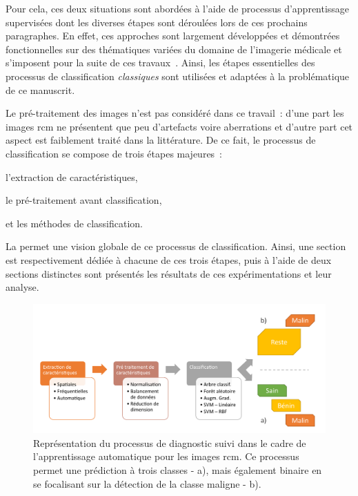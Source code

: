 Pour cela, ces deux situations sont abordées à l'aide de processus d'apprentissage supervisées dont les diverses étapes sont déroulées lors de ces prochains paragraphes. En effet, ces approches sont largement développées et démontrées fonctionnelles sur des thématiques variées du domaine de l'imagerie médicale et s'imposent pour la suite de ces travaux~\cite{Litjens2017,Pathan2018}. Ainsi, les étapes essentielles des processus de classification \textit{classiques} sont utilisées et adaptées à la problématique de ce manuscrit.\par

Le pré-traitement des images n'est pas considéré dans ce travail~: d'une part les images \gls{rcm} ne présentent que peu d'artefacts voire aberrations et d'autre part cet aspect est faiblement traité dans la littérature. De ce fait, le processus de classification se compose de trois étapes majeures~:
\begin{inlinerate}
    \item l'extraction de caractéristiques,
    \item le pré-traitement avant classification,
    \item et les méthodes de classification.
\end{inlinerate} La  permet une vision globale de ce processus de classification. Ainsi, une section est respectivement dédiée à chacune de ces trois étapes, puis à l'aide de deux sections distinctes sont présentés les résultats de ces expérimentations et leur analyse.\par

\begin{figure}[H]
\centering
    \includegraphics[width=\linewidth]{contents/chapter_4/resources/scheme_macro_image_classification.pdf}
    \caption{Représentation du processus de diagnostic suivi dans le cadre de l'apprentissage automatique pour les images \gls{rcm}. Ce processus permet une prédiction à trois classes - a), mais également binaire en se focalisant sur la détection de la classe maligne - b).}
    \label{fig:scheme_macro_image_classification}
\end{figure}\par

